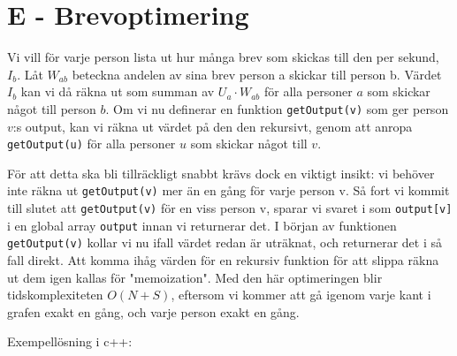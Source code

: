 \section*{E - Brevoptimering}

Vi vill för varje person lista ut hur många brev som skickas till den per sekund, $I_b$. Låt $W_{ab}$ beteckna andelen av sina brev person a skickar till person b. Värdet $I_b$ kan vi då räkna ut som summan av $U_a \cdot W_{ab}$ för alla personer $a$ som skickar något till person $b$. Om vi nu definerar en funktion \texttt{getOutput(v)} som ger person $v$:s output, kan vi räkna ut värdet på den den rekursivt, genom att anropa \texttt{getOutput(u)} för alla personer $u$ som skickar något till $v$.

För att detta ska bli tillräckligt snabbt krävs dock en viktigt insikt: vi behöver inte räkna ut \texttt{getOutput(v)} mer än en gång för varje person v. Så fort vi kommit till slutet att \texttt{getOutput(v)} för en viss person v, sparar vi svaret i som \texttt{output[v]} i en global array \texttt{output} innan vi returnerar det. I början av funktionen \texttt{getOutput(v)} kollar vi nu ifall värdet redan är uträknat, och returnerar det i så fall direkt. Att komma ihåg värden för en rekursiv funktion för att slippa räkna ut dem igen kallas för "memoization". Med den här optimeringen blir tidskomplexiteten $O(N+S)$, eftersom vi kommer att gå igenom varje kant i grafen exakt en gång, och varje person exakt en gång.

Exempellösning i c++:

